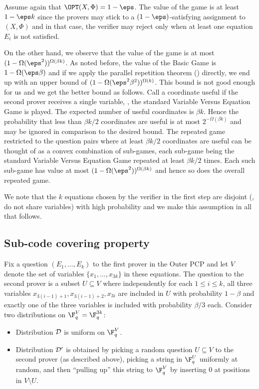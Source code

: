Assume again that $\OPT(X,\Phi) = 1-\eps$.  The value of the game is at least $1-\eps k $
since the provers
may stick to a $(1-\eps)$-satisfying assignment to $(X,\Phi)$ and in that case, the verifier may reject only
when at least one equation $E_i$ is not satisfied.

On the other hand, we observe that the value of the game is at most $(1-\Omega(\eps^2))^{\Omega(\beta k)}$.
As noted before, the value of the Basic Game is $1-\Omega(\eps \beta)$ and if we apply the parallel repetition
theorem () directly, we end up with an upper bound of
$(1-\Omega(\eps^2 \beta^2))^{\Omega(k)}$. This bound is not good enough for us and
we get the better bound as follows.
Call a coordinate useful if the second prover receives a single variable, \ie,
the standard Variable Versus Equation Game is played. The expected number of useful
coordinates is $\beta k$. Hence the probability that less than $\beta k/2$
coordinates are useful is at most $2^{-\Omega(\beta k)}$ and may be ignored in comparison to the desired bound.
The repeated game restricted to the question pairs where at least $\beta k/2$
coordinates are useful can be thought of as a convex combination of sub-games,
each sub-game being the standard Variable Versus Equation Game repeated at least
$\beta k/2$ times. Each such sub-game has value at most $(1-\Omega(\eps^2))^{\Omega(\beta k)}$
and hence
so does the overall repeated game.

We note that the $k$ equations chosen by the verifier in the first step are
disjoint (\ie, do not share variables)
with high probability and we make this assumption in all that follows.


\subsection{Sub-code covering property}

Fix a question $(E_1, \ldots, E_k)$ to the first prover in the Outer PCP and
let $V$ denote the set of variables $\{x_1,\ldots,x_{3k}\}$ in these equations.
The question to the second prover is a subset $U \subseteq V$ where independently
for each $1 \leq i \leq k$,
all three variables
$x_{3(i-1)+1}, x_{3(i-1)+2}, x_{3i}$ are included in $U$ with probability $1-\beta$ and
exactly one of the three variables is included with probability ${\beta}/{3}$ each.
Consider two
distributions on $\F_q^V = \F_q^{3k}$:
\begin{itemize}
\item Distribution ${\cal D}$ is uniform on $\F_q^{V}$.
\item Distribution ${\cal D'}$
%
%
%
is obtained by picking
a random question $U \subseteq V$ to the second prover (as described above),
picking a string
in $\F_q^U$ uniformly at random, and then ``pulling up'' this string to
$\F_q^V$ by inserting $0$ at positions in $V \setminus U$.
\end{itemize}

